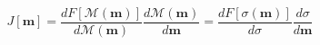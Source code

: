 \begin{equation}
    J[\mathbf{m}] = \frac{d F[\mathcal{M}(\mathbf{m})]}{d \mathcal{M}(\mathbf{m})}\frac{d \mathcal{M}(\mathbf{m})}{d \mathbf{m}} = \frac{d F[\sigma(\mathbf{m})]}{d \sigma}\frac{d \sigma}{d \mathbf{m}}
\label{eq:sensitivity_mappings}
\end{equation}
